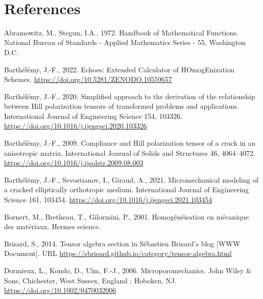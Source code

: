 \documentclass[
  letterpaper,
  DIV=11,
  numbers=noendperiod]{scrreprt}
\newlength{\cslhangindent}
\newenvironment{CSLReferences}[2] %
 {\begin{list}{}{%
  \setlength{\itemindent}{0pt}
  \setlength{\leftmargin}{0pt}
  \setlength{\parsep}{0pt}
  \ifodd #1
   \setlength{\leftmargin}{\cslhangindent}
   \setlength{\itemindent}{-1\cslhangindent}
  \fi
  \setlength{\itemsep}{#2\baselineskip}}}
 {\end{list}}
\begin{document}
\(\,\)


\chapter*{References}\label{references}


\label{refs}
\begin{CSLReferences}{1}{0}
Abramowitz, M., Stegun, I.A., 1972. Handbook of {Mathematical
Functions}. National Bureau of Standards - Applied Mathematics Series -
55, Washington D.C.

Barthélémy, J.-F., 2022. Echoes: {Extended Calculator} of
{HOmogEnization Schemes}. \url{https://doi.org/10.5281/ZENODO.10559657}

Barthélémy, J.-F., 2020. Simplified approach to the derivation of the
relationship between {Hill} polarization tensors of transformed problems
and applications. International Journal of Engineering Science 154,
103326. \url{https://doi.org/10.1016/j.ijengsci.2020.103326}

Barthélémy, J.-F., 2009. Compliance and {Hill} polarization tensor of a
crack in an anisotropic matrix. International Journal of Solids and
Structures 46, 4064--4072.
\url{https://doi.org/10.1016/j.ijsolstr.2009.08.003}

Barthélémy, J.-F., Sevostianov, I., Giraud, A., 2021. Micromechanical
modeling of a cracked elliptically orthotropic medium. International
Journal of Engineering Science 161, 103454.
\url{https://doi.org/10.1016/j.ijengsci.2021.103454}

Bornert, M., Bretheau, T., Gilormini, P., 2001. Homogénéisation en
mécanique des matériaux. Hermes science.

Brisard, S., 2014. Tensor algebra section in {Sébastien Brisard}'s blog
{[}WWW Document{]}. URL
\url{https://sbrisard.github.io/category/tensor-algebra.html}

Dormieux, L., Kondo, D., Ulm, F.-J., 2006. Microporomechanics. John
Wiley \& Sons, Chichester, West Sussex, England ; Hoboken, NJ.
\url{https://doi.org/10.1002/0470032006}


\end{CSLReferences}
\end{document}
